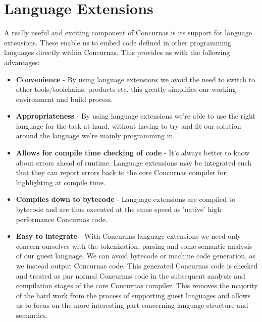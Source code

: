 \documentclass[conc-doc]{subfiles}
\begin{document}
	
	\chapter[Language Extensions]{Language Extensions}
	\label{ch:langExt}



A really useful and exciting component of Concurnas is its support for language extensions. These enable us to embed code defined in other programming languages directly within Concurnas. This provides us with the following advantages:

\begin{itemize}
	\item \textbf{Convenience} - By using language extensions we avoid the need to switch to other tools/toolchains, products etc. this greatly simplifies our working environment and build process.
	\item \textbf{Appropriateness} - By using language extensions we're able to use the right language for the task at hand, without having to try and fit our solution around the language we're mainly programming in.
	\item \textbf{Allows for compile time checking of code} - It's always better to know about errors ahead of runtime. Language extensions may be integrated such that they can report errors back to the core Concurnas compiler for highlighting at compile time. 
	\item \textbf{Compiles down to bytecode} - Language extensions are compiled to bytecode and are thus executed at the same speed as 'native' high performance Concurnas code.
	\item \textbf{Easy to integrate} - With Concurnas language extensions we need only concern ourselves with the tokenization, parsing and some semantic analysis of our guest language. We can avoid bytecode or machine code generation, as we instead output Concurnas code. This generated Concurnas code is checked and treated as par normal Concurnas code in the subsequent analysis and compilation stages of the core Concurnas compiler. This removes the majority of the hard work from the process of supporting guest languages and allows us to focus on the more interesting part concerning language structure and semantics.
\end{itemize}
\end{document}
